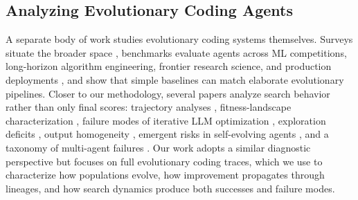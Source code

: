 \subsection{Analyzing Evolutionary Coding Agents}
A separate body of work studies evolutionary coding systems themselves.
Surveys situate the broader space \citep{fang2025,xie2025b}, benchmarks evaluate agents across ML competitions, long-horizon algorithm engineering, frontier research science, and production deployments \citep{chan2025b,imajuku2025,lupidi2026,ye2026a,pan2026,zheng2026a}, and \citet{gideoni2026} show that simple baselines can match elaborate evolutionary pipelines.
Closer to our methodology, several papers analyze search behavior rather than only final scores: trajectory analyses \citep{zhang2026d}, fitness-landscape characterization \citep{liu2025a}, failure modes of iterative LLM optimization \citep{nie2026}, exploration deficits \citep{pan2025}, output homogeneity \citep{jiang2025}, emergent risks in self-evolving agents \citep{shao2026}, and a taxonomy of multi-agent failures \citep{cemri2025}.
Our work adopts a similar diagnostic perspective but focuses on full evolutionary coding traces, which we use to characterize how populations evolve, how improvement propagates through lineages, and how search dynamics produce both successes and failure modes.
